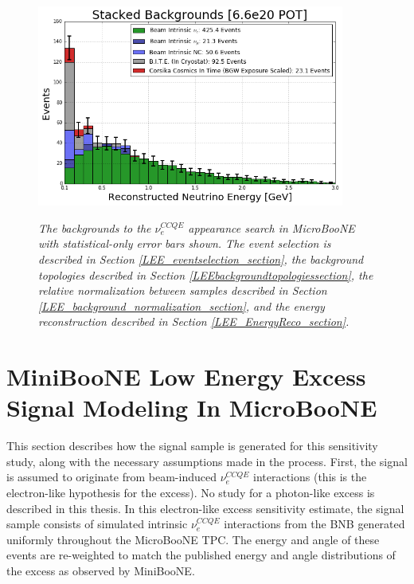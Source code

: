\begin{figure}[ht!]
\centering
\includegraphics[width=0.9\textwidth]{Figures/LEE_stackedbackgrounds_nosignal_withAnalysisCuts.png}\\
\caption{\textit{The backgrounds to the $\nu_e^{CCQE}$ appearance search in MicroBooNE with statistical-only error bars shown. The event selection is described in Section \ref{LEE_eventselection_section}, the background topologies described in Section \ref{LEEbackgroundtopologiessection}, the relative normalization between samples described in Section \ref{LEE_background_normalization_section}, and the energy reconstruction described in Section \ref{LEE_EnergyReco_section}.}}
\label{LEE_stackedbackgrounds_nosignal_withanalysiscuts_fig}
\end{figure}





\section{MiniBooNE Low Energy Excess Signal Modeling In MicroBooNE}\label{MBLEESignalModeling_section}
This section describes how the signal sample is generated for this sensitivity study, along with the necessary assumptions made in the process. First, the signal is assumed to originate from beam-induced $\nu_e^{CCQE}$ interactions (this is the electron-like hypothesis for the excess). No study for a photon-like excess is described in this thesis. In this electron-like excess sensitivity estimate, the signal sample consists of simulated intrinsic $\nu_e^{CCQE}$ interactions from the BNB generated uniformly throughout the MicroBooNE TPC. The energy and angle of these events are re-weighted to match the published energy and angle distributions of the excess as observed by MiniBooNE. \\

